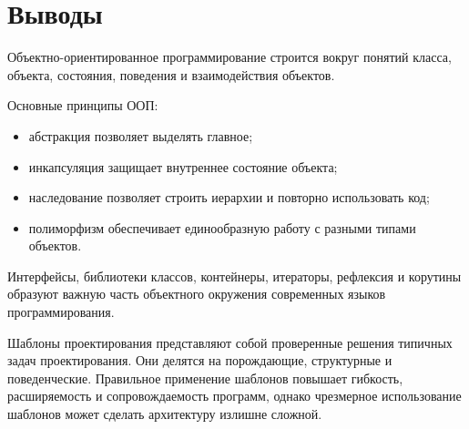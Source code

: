 \documentclass[12pt,a4paper]{article}
\begin{document}
\section{Выводы}

Объектно-ориентированное программирование строится вокруг понятий класса, объекта, состояния, поведения и взаимодействия объектов.

Основные принципы ООП:
\begin{itemize}
    \item абстракция позволяет выделять главное;
    \item инкапсуляция защищает внутреннее состояние объекта;
    \item наследование позволяет строить иерархии и повторно использовать код;
    \item полиморфизм обеспечивает единообразную работу с разными типами объектов.
\end{itemize}

Интерфейсы, библиотеки классов, контейнеры, итераторы, рефлексия и корутины образуют важную часть объектного окружения современных языков программирования.

Шаблоны проектирования представляют собой проверенные решения типичных задач проектирования. Они делятся на порождающие, структурные и поведенческие. Правильное применение шаблонов повышает гибкость, расширяемость и сопровождаемость программ, однако чрезмерное использование шаблонов может сделать архитектуру излишне сложной.
\end{document}
